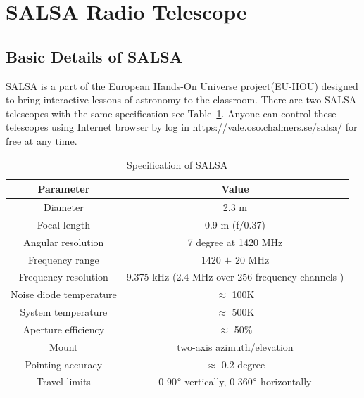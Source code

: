 \documentclass[conference]{IEEEtran}
\begin{document}
\section{SALSA Radio Telescope}

\subsection{Basic Details of SALSA}

SALSA is a part of the European Hands-On Universe project(EU-HOU)\cite{Ferlet2006} designed to bring interactive lessons of astronomy to the classroom\cite{SALSAS2018}. There are two SALSA telescopes with the same specification see Table~\ref{Tab:salsa_specification}\cite{ThomasBensby2017}. Anyone can control these telescopes using Internet browser by log in https://vale.oso.chalmers.se/salsa/ for free at any time. 


\begin{table}[htbp]
\caption{Specification of SALSA}
\begin{center}
\begin{tabular}{|c|c|}
\hline
\textbf{Parameter}&\multicolumn{1}{|c|}{\textbf{Value}} \\
\cline{1-2} 
\hline
Diameter & 2.3 m\\
\hline
Focal length & 0.9 m (f/0.37)\\
\hline
Angular resolution & 7 degree at 1420 MHz\\
\hline
Frequency range & 1420 $\pm$ 20 MHz\\
\hline
Frequency resolution & 9.375 kHz (2.4 MHz over 256 frequency channels )\\
\hline
Noise diode temperature & $\approx$ 100K\\
\hline
System temperature & $\approx$ 500K\\
\hline
Aperture efficiency & $\approx$ 50$\%$\\
\hline
Mount & two-axis azimuth/elevation\\
\hline
Pointing accuracy & $\approx$ 0.2 degree\\
\hline
Travel limits &  0-90$\degree$ vertically, 0-360$\degree$ horizontally\\
\hline
\end{tabular}
\label{Tab:salsa_specification}
\end{center}
\end{table}
\end{document}
